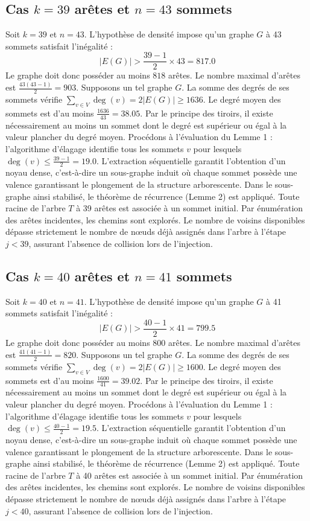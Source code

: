 \documentclass[12pt,a4paper]{article}
\begin{document}
\subsection{Cas $k = 39$ arêtes et $n = 43$ sommets}
Soit $k = 39$ et $n = 43$. L'hypothèse de densité impose qu'un graphe $G$ à 43 sommets satisfait l'inégalité :
$$ |E(G)| > \frac{39-1}{2} \times 43 = 817.0 $$
Le graphe doit donc posséder au moins $818$ arêtes. Le nombre maximal d'arêtes est $\frac{43(43-1)}{2} = 903$.
Supposons un tel graphe $G$. La somme des degrés de ses sommets vérifie $\sum_{v \in V} \deg(v) = 2|E(G)| \geq 1636$.
Le degré moyen des sommets est d'au moins $\frac{1636}{43} = 38.05$.
Par le principe des tiroirs, il existe nécessairement au moins un sommet dont le degré est supérieur ou égal à la valeur plancher du degré moyen.
Procédons à l'évaluation du Lemme 1 : l'algorithme d'élagage identifie tous les sommets $v$ pour lesquels $\deg(v) \leq \frac{39-1}{2} = 19.0$.
L'extraction séquentielle garantit l'obtention d'un noyau dense, c'est-à-dire un sous-graphe induit où chaque sommet possède une valence garantissant le plongement de la structure arborescente.
Dans le sous-graphe ainsi stabilisé, le théorème de récurrence (Lemme 2) est appliqué. Toute racine de l'arbre $T$ à 39 arêtes est associée à un sommet initial. Par énumération des arêtes incidentes, les chemins sont explorés. Le nombre de voisins disponibles dépasse strictement le nombre de nœuds déjà assignés dans l'arbre à l'étape $j < 39$, assurant l'absence de collision lors de l'injection.

\subsection{Cas $k = 40$ arêtes et $n = 41$ sommets}
Soit $k = 40$ et $n = 41$. L'hypothèse de densité impose qu'un graphe $G$ à 41 sommets satisfait l'inégalité :
$$ |E(G)| > \frac{40-1}{2} \times 41 = 799.5 $$
Le graphe doit donc posséder au moins $800$ arêtes. Le nombre maximal d'arêtes est $\frac{41(41-1)}{2} = 820$.
Supposons un tel graphe $G$. La somme des degrés de ses sommets vérifie $\sum_{v \in V} \deg(v) = 2|E(G)| \geq 1600$.
Le degré moyen des sommets est d'au moins $\frac{1600}{41} = 39.02$.
Par le principe des tiroirs, il existe nécessairement au moins un sommet dont le degré est supérieur ou égal à la valeur plancher du degré moyen.
Procédons à l'évaluation du Lemme 1 : l'algorithme d'élagage identifie tous les sommets $v$ pour lesquels $\deg(v) \leq \frac{40-1}{2} = 19.5$.
L'extraction séquentielle garantit l'obtention d'un noyau dense, c'est-à-dire un sous-graphe induit où chaque sommet possède une valence garantissant le plongement de la structure arborescente.
Dans le sous-graphe ainsi stabilisé, le théorème de récurrence (Lemme 2) est appliqué. Toute racine de l'arbre $T$ à 40 arêtes est associée à un sommet initial. Par énumération des arêtes incidentes, les chemins sont explorés. Le nombre de voisins disponibles dépasse strictement le nombre de nœuds déjà assignés dans l'arbre à l'étape $j < 40$, assurant l'absence de collision lors de l'injection.
\end{document}
